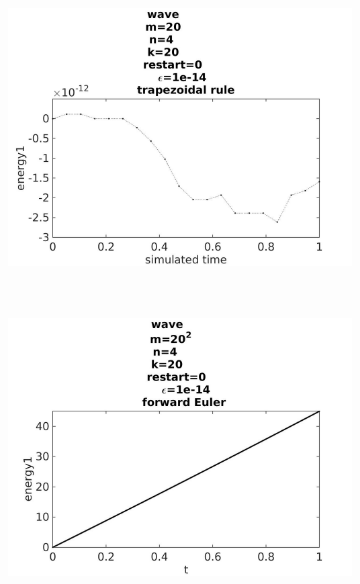 \begin{figure}[H]
        \centering
        \begin{subfigure}[b]{0.30\textwidth}
                \includegraphics[width=\textwidth]{../MATLAB/fig/energyovertimetrapezoidal.jpg}
                \caption{  }
                \label{fig:energyovertimetrapezoidal}
        \end{subfigure}%
        ~
        \begin{subfigure}[b]{0.30\textwidth}
                \includegraphics[width=\textwidth]{../MATLAB/fig/energyovertimeeuler.jpg}
                \caption{  }
                \label{fig:energyovertimeeuler}
        \end{subfigure}
        \begin{subfigure}[b]{0.30\textwidth}

\end{subfigure}
\end{figure}
